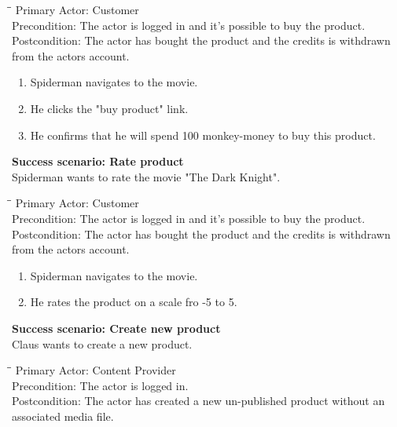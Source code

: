 \begin{tabbing}
\hspace{5mm}\=\hspace{26mm}\=\kill
\>Primary Actor:\> Customer\\
\>Precondition:\> The actor is logged in and it's possible to buy the product.\\
\>Postcondition:\> The actor has bought the product and the credits is withdrawn from the actors account.
\end{tabbing}
\begin{enumerate} \setlength{\itemsep}{-1mm}
	\item Spiderman navigates to the movie.
	\item He clicks the "buy product" link.
	\item He confirms that he will spend 100 monkey-money to buy this product.
\end{enumerate}
\vspace{3mm}
\textbf{Success scenario: Rate product} \\
Spiderman wants to rate the movie "The Dark Knight". 
\begin{tabbing}
\hspace{5mm}\=\hspace{26mm}\=\kill
\>Primary Actor:\> Customer\\
\>Precondition:\> The actor is logged in and it's possible to buy the product.\\
\>Postcondition:\> The actor has bought the product and the credits is withdrawn from the actors account.
\end{tabbing}
\begin{enumerate} \setlength{\itemsep}{-1mm}
	\item Spiderman navigates to the movie.
	\item He rates the product on a scale fro -5 to 5.
\end{enumerate}
\vspace{3mm}
\textbf{Success scenario: Create new product} \\
Claus wants to create a new product. 
\begin{tabbing}
\hspace{5mm}\=\hspace{26mm}\=\kill
\>Primary Actor:\> Content Provider\\
\>Precondition:\> The actor is logged in.\\
\>Postcondition:\> The actor has created a new un-published product without an associated media file.
\end{tabbing}
